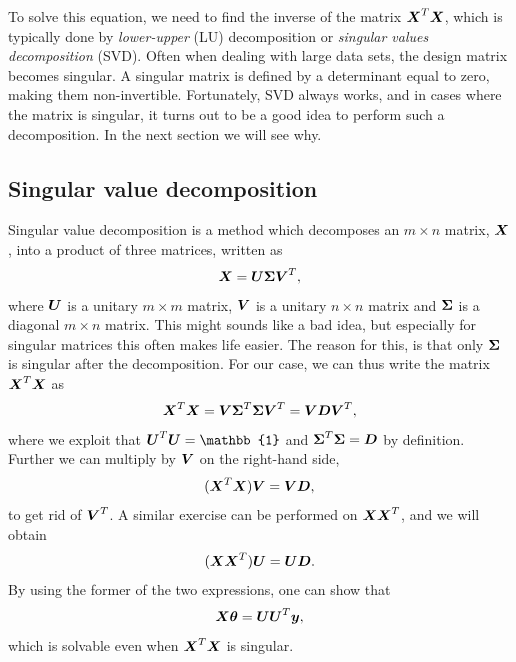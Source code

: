 To solve this equation, we need to find the inverse of the matrix $\boldsymbol{{X}}^T\boldsymbol{{X}}$, which is typically done by \textit{lower-upper} (LU) decomposition or \textit{singular values decomposition} (SVD). Often when dealing with large data sets, the design matrix becomes singular. A singular matrix is defined by a determinant equal to zero, making them non-invertible. Fortunately, SVD always works, and in cases where the matrix is singular, it turns out to be a good idea to perform such a decomposition. In the next section we will see why.

\subsection{Singular value decomposition}
Singular value decomposition is a method which decomposes an $m\times n$ matrix, $\boldsymbol{{X}}$, into a product of three matrices, written as
\begin{equation}
\boldsymbol{{X}}=\boldsymbol{{U}}\boldsymbol{{\Sigma}}\boldsymbol{{V}}^T,
\end{equation}
where $\boldsymbol{{U}}$ is a unitary $m\times m$ matrix, $\boldsymbol{{V}}$ is a unitary $n\times n$ matrix and $\boldsymbol{{\Sigma}}$ is a diagonal $m\times n$ matrix. This might sounds like a bad idea, but especially for singular matrices this often makes life easier. The reason for this, is that only $\boldsymbol{{\Sigma}}$ is singular after the decomposition. For our case, we can thus write the matrix $\boldsymbol{{X}}^T\boldsymbol{{X}}$ as 
\begin{equation}
\boldsymbol{{X}}^T\boldsymbol{{X}}=\boldsymbol{{V}}\boldsymbol{{\Sigma}}^T\boldsymbol{{\Sigma}}\boldsymbol{{V}}^T=\boldsymbol{{V}}\boldsymbol{{D}}\boldsymbol{{V}}^T,
\end{equation}
where we exploit that $\bs{U}^T\bs{U}=\mathbb{1}$ and $\boldsymbol{{\Sigma}}^T\boldsymbol{{\Sigma}}=\boldsymbol{{D}}$ by definition. Further we can multiply by $\boldsymbol{{V}}$ on the right-hand side,
\begin{equation}
(\boldsymbol{{X}}^T\boldsymbol{{X}})\boldsymbol{{V}}=\boldsymbol{{V}}\boldsymbol{{D}},
\end{equation}
to get rid of $\boldsymbol{{V}}^T$. A similar exercise can be performed on $\boldsymbol{{X}}\boldsymbol{{X}}^T$, and we will obtain
\begin{equation}
(\boldsymbol{{X}}\boldsymbol{{X}}^T)\boldsymbol{{U}}=\boldsymbol{{U}}\boldsymbol{{D}}.
\end{equation}
By using the former of the two expressions, one can show that
\begin{equation}
\boldsymbol{{X}}\boldsymbol{{\theta}}=\boldsymbol{{U}}\boldsymbol{{U}}^T\boldsymbol{{y}},
\end{equation}
which is solvable even when $\boldsymbol{{X}}^T\boldsymbol{{X}}$ is singular.

